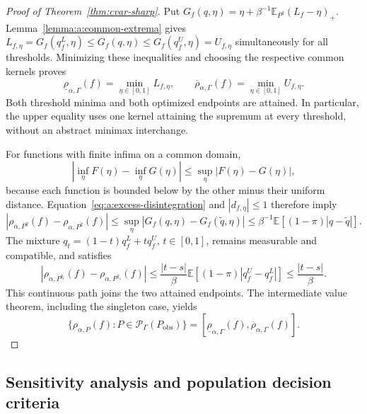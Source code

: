 \begin{proof}[Proof of Theorem~\ref{thm:cvar-sharp}]
Put $G_f(q,\eta)=\eta+\beta^{-1}\mathbb E_{P^q}(L_f-\eta)_+$. Lemma~\ref{lemma:a:common-extrema} gives $L_{f,\eta}=G_f(q_f^L,\eta)\leq G_f(q,\eta)\leq G_f(q_f^U,\eta)=U_{f,\eta}$ simultaneously for all thresholds. Minimizing these inequalities and choosing the respective common kernels proves
\begin{equation}
\underline\rho_{\alpha,\Gamma}(f)=\min_{\eta\in[0,1]}L_{f,\eta},\qquad
\overline\rho_{\alpha,\Gamma}(f)=\min_{\eta\in[0,1]}U_{f,\eta}.
\label{eq:a:sharp-endpoints}
\end{equation}
Both threshold minima and both optimized endpoints are attained. In particular, the upper equality uses one kernel attaining the supremum at every threshold, without an abstract minimax interchange.

For functions with finite infima on a common domain,
\begin{equation}
\left|\inf_\eta F(\eta)-\inf_\eta G(\eta)\right|
\leq\sup_\eta|F(\eta)-G(\eta)|,
\label{eq:a:infimum-stability}
\end{equation}
because each function is bounded below by the other minus their uniform distance. Equation~\eqref{eq:a:excess-disintegration} and $|d_{f,\eta}|\leq1$ therefore imply
\[
|\rho_{\alpha,P^q}(f)-\rho_{\alpha,P^{\widetilde q}}(f)|
\leq\sup_\eta|G_f(q,\eta)-G_f(\widetilde q,\eta)|
\leq\beta^{-1}\mathbb E[(1-\pi)|q-\widetilde q|].
\]
The mixture $q_t=(1-t)q_f^L+tq_f^U$, $t\in[0,1]$, remains measurable and compatible, and satisfies
\begin{equation}
|\rho_{\alpha,P^{q_t}}(f)-\rho_{\alpha,P^{q_s}}(f)|
\leq\frac{|t-s|}{\beta}\mathbb E[(1-\pi)|q_f^U-q_f^L|]
\leq\frac{|t-s|}{\beta}.
\label{eq:a:mixture-lipschitz}
\end{equation}
This continuous path joins the two attained endpoints. The intermediate value theorem, including the singleton case, yields
\begin{equation}
\{\rho_{\alpha,P}(f):P\in\mathcal P_\Gamma(P_{\mathrm{obs}})\}
=[\underline\rho_{\alpha,\Gamma}(f),\overline\rho_{\alpha,\Gamma}(f)].
\label{eq:a:sharp-interval}
\end{equation}
\end{proof}

\subsection{Sensitivity analysis and population decision criteria}
\label{app:sensitivity}\label{app:comparison-scope}

